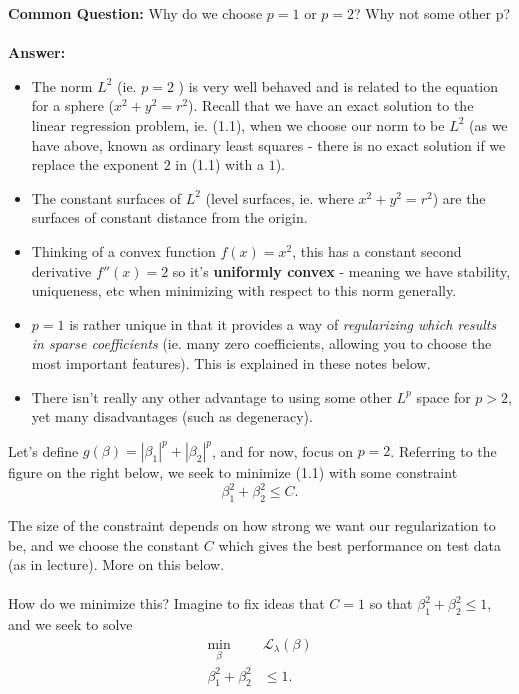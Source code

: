 \documentclass[paper=a4, fontsize=11pt]{scrartcl} %
\numberwithin{equation}{section} %
\numberwithin{figure}{section} %
\numberwithin{table}{section} %
\begin{document}
\textbf{Common Question:} Why do we choose $p=1$ or $p=2$? Why not some other p?\\\\

\textbf{Answer:} 
\begin{itemize}
\item The norm $L^2$ (ie. $p=2$ )  is very well behaved and is related to the equation for a sphere ($x^2+y^2 = r^2$). Recall that we have an exact solution to the linear regression problem, ie. (1.1), when we choose our norm
to be $L^2$ (as we have above, known as ordinary least squares - there is no exact solution if we replace the exponent $2$ in (1.1) with a $1$). 
\item The constant surfaces of $L^2$ (level surfaces, ie. where $x^2 + y^2 = r^2$) are the surfaces of constant distance from the origin.
\item Thinking of a convex function $f(x) = x^2$, this has a constant second derivative $f''(x) = 2$ so it's \textbf{uniformly convex} - meaning we have stability, uniqueness, etc when minimizing with respect to this norm generally.
\item $p=1$ is rather unique in that it provides a way of \emph{regularizing which results in sparse coefficients } (ie. many zero coefficients, allowing you to choose the most important features). This is explained in these notes below.
\item There isn't really any other advantage to using some other $L^p$ space for $p > 2$, yet many disadvantages (such as degeneracy). 
\end{itemize}

Let's define $g(\beta) = |\beta_1|^p + |\beta_2|^p$, and for now, focus on $p=2$. Referring to the figure on the right below, we seek to minimize (1.1) with some constraint
\[ \beta_1^2 + \beta_2^2 \leq C.\]

The size of the constraint depends on how strong we want our regularization to be, and we choose the constant $C$ which gives the best performance on test data (as in lecture). More on this below.\\\\


How do we minimize this? Imagine to fix ideas that $C=1$ so that $\beta_1^2 + \beta_2^2 \leq 1$, and we seek to solve
\begin{align}
\min_{\beta} \; &\mathcal{L}_{\lambda} (\beta) \\
\beta_1^2 + \beta_2^2 &\leq 1.
\end{align}
\end{document}
